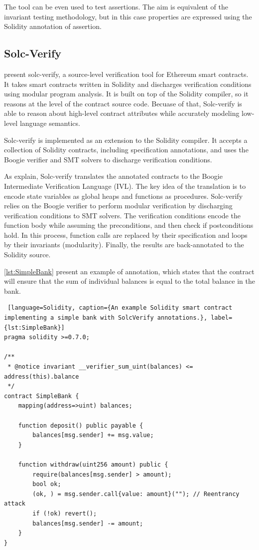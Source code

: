 The tool can be even used to test assertions. 
The aim is equivalent of the invariant testing methodology, 
but in this case properties are expressed using the Solidity annotation of assertion.

\subsection{Solc-Verify}
\label{sec:Specification:Solc-Verify}

\citet{SolcVerify} present solc-verify, a source-level verification tool for
Ethereum smart contracts. It takes smart contracts written
in Solidity and discharges verification conditions using modular program
analysis. It is built on top of the Solidity compiler, so it reasons at the level of the contract source code. 
Becuase of that, Solc-verify is able to reason about high-level contract attributes 
while accurately modeling low-level language semantics.

Solc-verify is implemented as an extension to the Solidity compiler.
It accepts a collection of Solidity contracts, including specification annotations, and uses 
the Boogie verifier and SMT solvers to discharge verification conditions. 

As \citet{SolcVerify_2} explain, Solc-verify translates the annotated contracts to the Boogie Intermediate Verification
Language (IVL). The key idea of the translation is to encode state variables as global heaps
and functions as procedures. Solc-verify relies on the Boogie verifier to perform modular
verification by discharging verification conditions to SMT solvers. The verification conditions
encode the function body while assuming the preconditions, and then check if postconditions
hold. In this process, function calls are replaced by their specification and loops by their
invariants (modularity). Finally, the results are back-annotated to the Solidity source.

\autoref{lst:SimpleBank} present an example of annotation, which states that the contract will ensure
that the sum of individual balances is equal to the total balance in the bank.


\begin{lstlisting} [language=Solidity, caption={An example Solidity smart contract implementing a simple bank with SolcVerify annotations.}, label={lst:SimpleBank}]
pragma solidity >=0.7.0;

/**
 * @notice invariant __verifier_sum_uint(balances) <= address(this).balance
 */
contract SimpleBank {
    mapping(address=>uint) balances;

    function deposit() public payable {
        balances[msg.sender] += msg.value;
    }

    function withdraw(uint256 amount) public {
        require(balances[msg.sender] > amount);
        bool ok;
        (ok, ) = msg.sender.call{value: amount}(""); // Reentrancy attack
        if (!ok) revert();
        balances[msg.sender] -= amount;
    }
}
\end{lstlisting}




